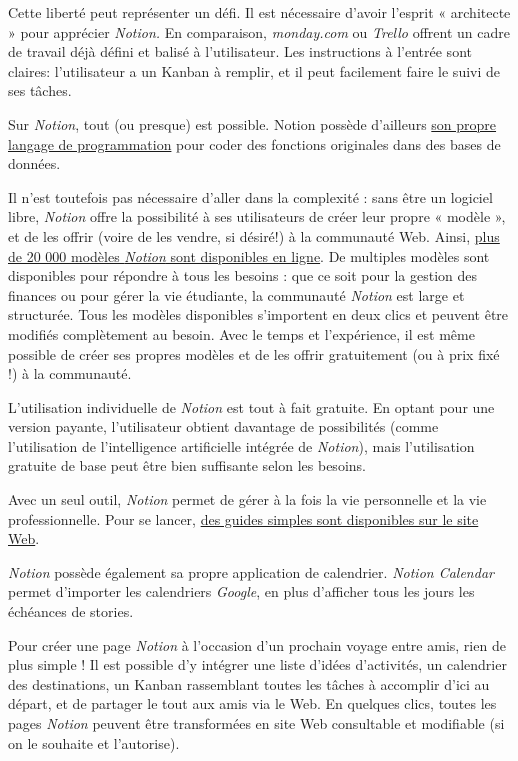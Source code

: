 \documentclass[
  letterpaper,
  DIV=11,
  numbers=noendperiod,
  oneside]{scrreprt}
\begin{document}
Cette liberté peut représenter un défi. Il est nécessaire d'avoir
l'esprit « architecte » pour apprécier \emph{Notion.} En comparaison,
\emph{monday.com} ou \emph{Trello} offrent un cadre de travail déjà
défini et balisé à l'utilisateur. Les instructions à l'entrée sont
claires: l'utilisateur a un Kanban à remplir, et il peut facilement
faire le suivi de ses tâches.

Sur \emph{Notion}, tout (ou presque) est possible. Notion possède
d'ailleurs \href{https://www.notion.so/fr/help/formulas}{son propre
langage de programmation} pour coder des fonctions originales dans des
bases de données.

Il n'est toutefois pas nécessaire d'aller dans la complexité : sans être
un logiciel libre, \emph{Notion} offre la possibilité à ses utilisateurs
de créer leur propre « modèle », et de les offrir (voire de les vendre,
si désiré!) à la communauté Web. Ainsi,
\href{https://www.notion.so/fr/templates}{plus de 20 000 modèles
\emph{Notion} sont disponibles en ligne}. De multiples modèles sont
disponibles pour répondre à tous les besoins : que ce soit pour la
gestion des finances ou pour gérer la vie étudiante, la communauté
\emph{Notion} est large et structurée. Tous les modèles disponibles
s'importent en deux clics et peuvent être modifiés complètement au
besoin. Avec le temps et l'expérience, il est même possible de créer ses
propres modèles et de les offrir gratuitement (ou à prix fixé !) à la
communauté.

L'utilisation individuelle de \emph{Notion} est tout à fait gratuite. En
optant pour une version payante, l'utilisateur obtient davantage de
possibilités (comme l'utilisation de l'intelligence artificielle
intégrée de \emph{Notion}), mais l'utilisation gratuite de base peut
être bien suffisante selon les besoins.

Avec un seul outil, \emph{Notion} permet de gérer à la fois la vie
personnelle et la vie professionnelle. Pour se lancer,
\href{https://www.notion.so/fr/help/category/new-to-notion}{des guides
simples sont disponibles sur le site Web}.

\emph{Notion} possède également sa propre application de calendrier.
\emph{Notion Calendar} permet d'importer les calendriers \emph{Google},
en plus d'afficher tous les jours les échéances de stories.

Pour créer une page \emph{Notion} à l'occasion d'un prochain voyage
entre amis, rien de plus simple ! Il est possible d'y intégrer une liste
d'idées d'activités, un calendrier des destinations, un Kanban
rassemblant toutes les tâches à accomplir d'ici au départ, et de
partager le tout aux amis via le Web. En quelques clics, toutes les
pages \emph{Notion} peuvent être transformées en site Web consultable et
modifiable (si on le souhaite et l'autorise).
\end{document}

